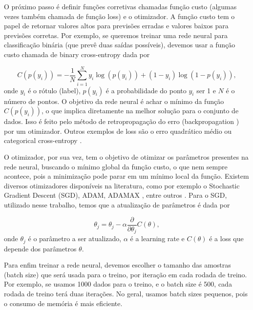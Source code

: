 \documentclass[a4paper,12pt,oneside]{book}
\begin{document}
\par O próximo passo é definir funções corretivas chamadas função custo (algumas vezes também chamada de função loss) e o otimizador. A função custo tem o papel de retornar valores altos para previsões erradas e valores baixos para previsões corretas. Por exemplo, se queremos treinar uma rede neural para classificação binária (que prevê duas saídas possíveis), devemos usar a função custo chamada de binary cross-entropy dada por \cite{dl_book}

\begin{equation}\label{eq:binary_cross_entropy}
    C(p(y_i)) = -\frac{1}{N}\sum_{i = 1} ^N y_i \log(p(y_i)) + (1 - y_i)\log(1 - p(y_i)),
\end{equation}
%
onde $y_i$ é o rótulo (label), $p(y_i)$ é a probabilidade do ponto $y_i$ ser 1 e $N$ é o número de pontos. O objetivo da rede neural é achar o mínimo da função $C(p(y_i))$, o que implica diretamente na melhor solução para o conjunto de dados. Isso é feito pelo método de retropropagação do erro (backpropagation \cite{backpropagation}) por um otimizador. Outros exemplos de loss são o erro quadrático médio ou categorical cross-entropy \cite{MSE_CEF_review}.

\par O otimizador, por sua vez, tem o objetivo de otimizar os parâmetros presentes na rede neural, buscando o mínimo global da função custo, o que nem sempre acontece, pois a minimização pode parar em um mínimo local da função. Existem diversos otimizadores disponíveis na literatura, como por exemplo o Stochastic Gradient Descent (SGD), ADAM, ADAMAX \cite{ADAMAX}, entre outros \cite{gradient_over}. Para o SGD, utilizado nesse trabalho, temos que a atualização de parâmetros é dada por

\begin{equation}\label{eq:SGD}
    \theta_j = \theta_{j} - \alpha \frac{\partial }{\partial \theta_j}C(\theta),
\end{equation}
%
onde $\theta_j$ é o parâmetro a ser atualizado, $\alpha$ é a learning rate e $C(\theta)$ é a loss que depende dos parâmetros $\theta$.

\par Para enfim treinar a rede neural, devemos escolher o tamanho das amostras (batch size) que será usada para o treino, por iteração em cada rodada de treino. Por exemplo, se usamos 1000 dados para o treino, e o batch size é 500, cada rodada de treino terá duas iterações. No geral, usamos batch sizes pequenos, pois o consumo de memória é mais eficiente.
\end{document}
